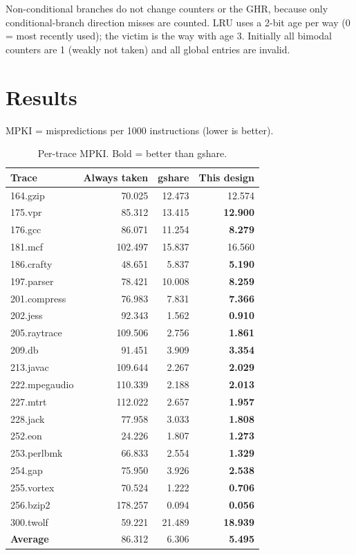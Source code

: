 \documentclass[11pt]{article}
\begin{document}
Non-conditional branches do not change counters or the GHR, because only
conditional-branch direction misses are counted. LRU uses a 2-bit age per way
(0 = most recently used); the victim is the way with age 3. Initially all
bimodal counters are 1 (weakly not taken) and all global entries are invalid.

\section{Results}

MPKI = mispredictions per 1000 instructions (lower is better).

\begin{table}[H]
\centering
\small
\begin{tabular}{lrrr}
\toprule
Trace & Always taken & gshare & This design \\
\midrule
164.gzip & 70.025 & 12.473 & 12.574 \\
175.vpr & 85.312 & 13.415 & \textbf{12.900} \\
176.gcc & 86.071 & 11.254 & \textbf{8.279} \\
181.mcf & 102.497 & 15.837 & 16.560 \\
186.crafty & 48.651 & 5.837 & \textbf{5.190} \\
197.parser & 78.421 & 10.008 & \textbf{8.259} \\
201.compress & 76.983 & 7.831 & \textbf{7.366} \\
202.jess & 92.343 & 1.562 & \textbf{0.910} \\
205.raytrace & 109.506 & 2.756 & \textbf{1.861} \\
209.db & 91.451 & 3.909 & \textbf{3.354} \\
213.javac & 109.644 & 2.267 & \textbf{2.029} \\
222.mpegaudio & 110.339 & 2.188 & \textbf{2.013} \\
227.mtrt & 112.022 & 2.657 & \textbf{1.957} \\
228.jack & 77.958 & 3.033 & \textbf{1.808} \\
252.eon & 24.226 & 1.807 & \textbf{1.273} \\
253.perlbmk & 66.833 & 2.554 & \textbf{1.329} \\
254.gap & 75.950 & 3.926 & \textbf{2.538} \\
255.vortex & 70.524 & 1.222 & \textbf{0.706} \\
256.bzip2 & 178.257 & 0.094 & \textbf{0.056} \\
300.twolf & 59.221 & 21.489 & \textbf{18.939} \\
\midrule
\textbf{Average} & 86.312 & 6.306 & \textbf{5.495} \\
\bottomrule
\end{tabular}
\caption{Per-trace MPKI. Bold = better than gshare.}
\end{table}
\end{document}
